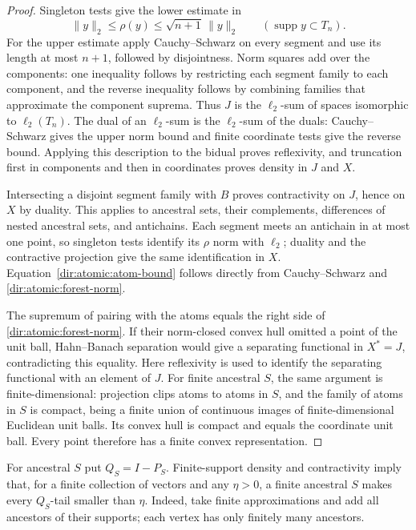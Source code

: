 \begin{proof}
Singleton tests give the lower estimate in
\[
 \|y\|_2\le\rho(y)\le\sqrt{n+1}\,\|y\|_2
 \qquad(\operatorname{supp}y\subset T_n).
\]
For the upper estimate apply Cauchy--Schwarz on every segment and use its
length at most $n+1$, followed by disjointness.  Norm squares add over the
components: one inequality follows by restricting each segment family to
each component, and the reverse inequality follows by combining families
that approximate the component suprema.  Thus $J$ is the $\ell_2$-sum of
spaces isomorphic to $\ell_2(T_n)$.  The dual of an $\ell_2$-sum is the
$\ell_2$-sum of the duals: Cauchy--Schwarz gives the upper norm bound and
finite coordinate tests give the reverse bound.  Applying this description
to the bidual proves reflexivity, and truncation first in components and
then in coordinates proves density in $J$ and $X$.

Intersecting a disjoint segment family with $B$ proves contractivity on
$J$, hence on $X$ by duality.  This applies to ancestral sets, their
complements, differences of nested ancestral sets, and antichains.  Each
segment meets an antichain in at most one point, so singleton tests identify
its $\rho$ norm with $\ell_2$; duality and the contractive projection give the
same identification in $X$.  Equation~\eqref{dir:atomic:atom-bound} follows
directly from Cauchy--Schwarz and \eqref{dir:atomic:forest-norm}.

The supremum of pairing with the atoms equals the right side of
\eqref{dir:atomic:forest-norm}.  If their norm-closed convex hull omitted a
point of the unit ball, Hahn--Banach separation would give a separating
functional in $X^*=J$, contradicting this equality.  Here reflexivity is
used to identify the separating functional with an element of $J$.  For
finite ancestral $S$, the same argument is finite-dimensional: projection
clips atoms to atoms in $S$, and the family of atoms in $S$ is compact,
being a finite union of continuous images of finite-dimensional Euclidean
unit balls.  Its convex hull is compact and equals the coordinate unit
ball.  Every point therefore has a finite convex representation.
\end{proof}

For ancestral $S$ put $Q_S=I-P_S$.  Finite-support density and
contractivity imply that, for a finite collection of vectors and any
$\eta>0$, a finite ancestral $S$ makes every $Q_S$-tail smaller than
$\eta$.  Indeed, take finite approximations and add all ancestors of their
supports; each vertex has only finitely many ancestors.


